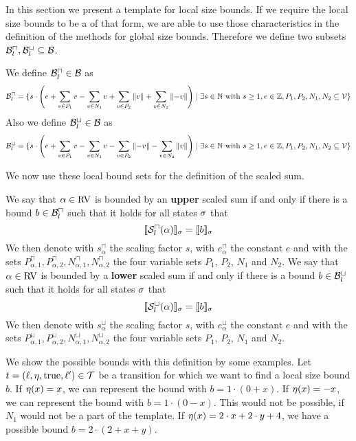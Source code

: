 In this section we present a template for local size bounds.
If we require the local size bounds to be a of that form, we are able to use those characteristics in the definition of the methods for global size bounds.
Therefore we define two subsets $\mathcal{B}^\sqcap_l, \mathcal{B}^\sqcup_l \subseteq \mathcal{B}$.

\begin{definition}
  We define $\mathcal{B}^\sqcap_l \in \mathcal{B}$ as 
  \[ \mathcal{B}^\sqcap_l = \lbrace 
    s \cdot \left(
        e
      + \sum_{v \in P_1} v
      - \sum_{v \in N_1} v
      + \sum_{v \in P_2} \left\Vert v\right\Vert
      + \sum_{v \in N_2} \left\Vert-v\right\Vert
      \right) \mid \exists s \in \mathbb{N} \text{ with } s \geq 1, e \in \mathbb{Z}, P_1, P_2, N_1, N_2 \subseteq \mathcal{V}  \rbrace\]
  Also we define $\mathcal{B}^\sqcup_l \in \mathcal{B}$ as 
  \[ \mathcal{B}^\sqcup_l = \lbrace 
    s \cdot \left(
        e
      + \sum_{v \in P_1} v
      - \sum_{v \in N_1} v
      - \sum_{v \in P_2} \left\Vert-v\right\Vert
      - \sum_{v \in N_2} \left\Vert v\right\Vert
      \right) \mid \exists s \in \mathbb{N} \text{ with } s \geq 1, e \in \mathbb{Z}, P_1, P_2, N_1, N_2 \subseteq \mathcal{V}  \rbrace\]
\end{definition}

We now use these local bound sets for the definition of the scaled sum.

\begin{definition}
  We say that $\alpha \in \text{RV}$ is bounded by an \textbf{upper} scaled sum if and only if there is a bound $b \in \mathcal{B}^\sqcap_l$ such that it holds for all states $\sigma$ that
  \[ \llbracket {\mathcal{S}^\sqcap_l}(\alpha) \rrbracket_{\sigma} = \llbracket b \rrbracket_{\sigma} \]
  We then denote with $s^\sqcap_\alpha$ the scaling factor $s$, with $e^\sqcap_\alpha$ the constant $e$ and with the sets $P_{\alpha,1}^\sqcap, P_{\alpha,2}^\sqcap, N_{\alpha,1}^\sqcap, N_{\alpha,2}^\sqcap$ the four variable sets $P_1$, $P_2$, $N_1$ and $N_2$.
  We say that $\alpha \in \text{RV}$ is bounded by a \textbf{lower} scaled sum if and only if there is a bound $b \in \mathcal{B}^\sqcup_l$ such that it holds for all states $\sigma$ that
  \[ \llbracket {\mathcal{S}^\sqcup_l}(\alpha) \rrbracket_{\sigma} = \llbracket b \rrbracket_{\sigma} \]
  We then denote with $s^\sqcup_\alpha$ the scaling factor $s$, with $e^\sqcup_\alpha$ the constant $e$ and with the sets $P_{\alpha,1}^\sqcup, P_{\alpha,2}^\sqcup, N_{\alpha,1}^\sqcup, N_{\alpha,2}^\sqcup$ the four variable sets $P_1$, $P_2$, $N_1$ and $N_2$.
\end{definition}

We show the possible bounds with this definition by some examples.
Let $t = (\ell,\eta,\text{true},\ell') \in \mathcal{T}$ be a transition for which we want to find a local size bound $b$.
If $\eta(x) = x$, we can represent the bound with $b = 1 \cdot (0 + x)$.
If $\eta(x) = -x$, we can represent the bound with $b = 1 \cdot (0 - x)$.
This would not be possible, if $N_1$ would not be a part of the template.
If $\eta(x) = 2 \cdot x + 2 \cdot y + 4$, we have a possible bound $b = 2 \cdot (2 + x + y)$.

